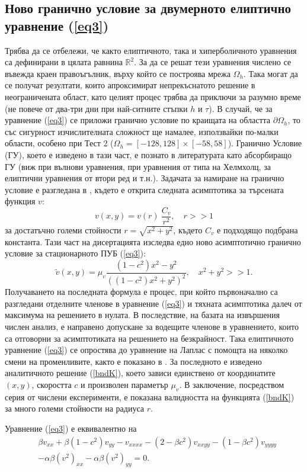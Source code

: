 \documentclass[a4paper]{article}
\newcommand{\be}{\begin{equation}}
\newcommand{\ee}{\end{equation}}
\newcommand{\rf}[1]{(\ref{#1})}
\newcommand{\RR}{\mathbb{R}}
\theoremstyle{remark}
\begin{document}
\begin{large}
\subsection{Ново гранично условие за двумерното елиптично уравнение \rf{eq3}}\label{newBndHead}
Трябва да се отбележи, че както елиптичното, така и хиперболичното уравнения са дефинирани в цялата равнина $\RR^2$. За да се решат тези уравнения числено се въвежда краен правоъгълник, върху който се построява мрежа $\Omega_h$. Така могат да се получат резултати, които апроксимират непрекъснатото решение в неограничената област, като целият процес трябва да приключи за разумно време (не повече от два-три дни при най-ситните стъпки $h$ и $\tau$). В случай, че за уравнение \rf{eq3} се приложи гранично условие по краищата на областта $\partial \Omega_h$, то със сигурност изчислителната сложност ще намалее, използвайки по-малки области, особено при Тест 2 ($\Omega_h = [-128, 128] \times [-58, 58]$). Гранично Условие (ГУ), което е изведено в тази част, е познато в литературата като абсорбиращо ГУ (виж \cite{ref31} при вълнови уравнения, \cite{ref32} при уравнения от типа на Хелмхолц, \cite{ref33} за елиптични уравнения от втори ред и т.н.). Задачата за намиране на гранично условие е разгледана в \cite{ref116}, където е открита следната асимптотика за търсената функция $v$:
\be
v(x,y) = v(r) ~ \frac{C_v}{r^2}, \quad r>>1
\ee
за достатъчно големи стойности $r = \sqrt{x^2 + y^2}$, където $C_v$ е подходящо подбрана константа. Тази част на дисертацията изследва едно ново асимптотично гранично условие за стационарното ПУБ \rf{eq3}:
\be\label{bndK}
\tilde v(x,y) = \mu_v \frac{ (1-c^2)x^2 - y^2}{ ((1-c^2)x^2 + y^2)^2}, \quad x^2 + y^2 >> 1.
\ee
Получаването на последната формула е процес, при който първоначално са разгледани отделните членове в уравнение \rf{eq3} и тяхната асимптотика далеч от максимума на решението в нулата. В последствие, на базата на извършения числен анализ, е направено допускане за водещите членове в уравнението, които са отговорни за асимптотиката на решението на безкрайност. Така елиптичното уравнение \rf{eq3} се опростява до уравнение на Лаплас с помощта на няколко смени на променливите, както е показано в \cite{bnd}. За последното е изведено аналитичното решение \rf{bndK}, което зависи единствено от координатите $(x,y)$, скоростта $c$ и произволен параметър $\mu_v$. В заключение, посредством серия от числени експерименти, е показана валидността на функцията \rf{bndK} за много големи стойности на радиуса $r$. 

Уравнение \rf{eq3} е еквивалентно на 
\begin{align}\label{eq3full}
&\beta v_{xx} + \beta (1-c^2) v_{yy} - v_{xxxx} - (2-\beta c^2)v_{xxyy} - (1-\beta c^2)v_{yyyy} \nonumber \\ 
&- \alpha \beta (v^2)_{xx} - \alpha \beta (v^2)_{yy}  =0.
\end{align}


\end{large}
\end{document}
